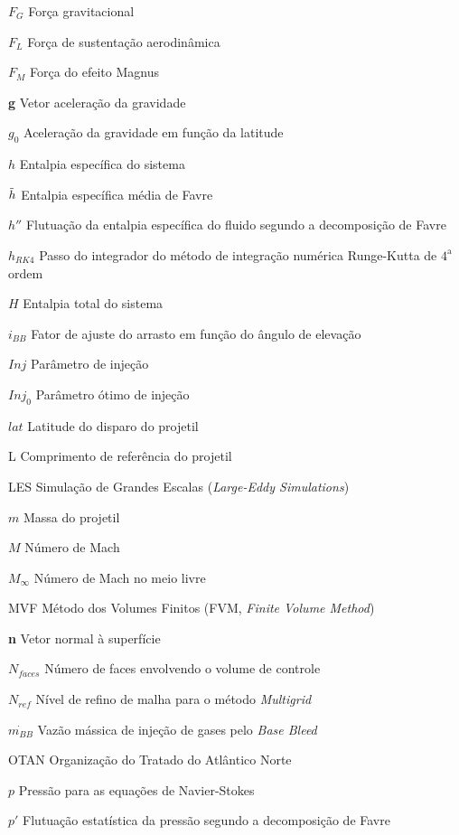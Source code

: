 \begin{siglas}
    \item[$F_{G}$] Força gravitacional
    \item[$F_{L}$] Força de sustentação aerodinâmica
    \item[$F_{M}$] Força do efeito Magnus
    \item[\textbf{g}] Vetor aceleração da gravidade
    \item[$g_0$] Aceleração da gravidade em função da latitude
    \item[$h$] Entalpia específica do sistema
    \item[$\Tilde{h}$] Entalpia específica média de Favre
    \item[$h''$] Flutuação da entalpia específica do fluido segundo a decomposição de Favre
    \item[$h_{RK4}$] Passo do integrador do método de integração numérica Runge-Kutta de $4^\text{a}$ ordem
    \item[$H$] Entalpia total do sistema
    \item[$i_{BB}$] Fator de ajuste do arrasto em função do ângulo de elevação
    \item[$Inj$] Parâmetro de injeção
    \item[$Inj_0$] Parâmetro ótimo de injeção
    \item[$lat$] Latitude do disparo do projetil
    \item[L] Comprimento de referência do projetil
    \item[LES] Simulação de Grandes Escalas (\textit{Large-Eddy Simulations})
    \item[$m$] Massa do projetil
    \item[$M$] Número de Mach
    \item[$M_{\infty}$] Número de Mach no meio livre
    \item[MVF] Método dos Volumes Finitos (FVM, \textit{Finite Volume Method})
    \item[\textbf{n}] Vetor normal à superfície
    \item[$N_{faces}$] Número de faces envolvendo o volume de controle
    \item[$N_{ref}$] Nível de refino de malha para o método \textit{Multigrid}
    \item[$\Dot{m_{BB}}$] Vazão mássica de injeção de gases pelo \textit{Base Bleed}
    \item[OTAN] Organização do Tratado do Atlântico Norte
    \item[$p$] Pressão para as equações de Navier-Stokes
    \item[$p'$] Flutuação estatística da pressão segundo a decomposição de Favre

\end{siglas}

